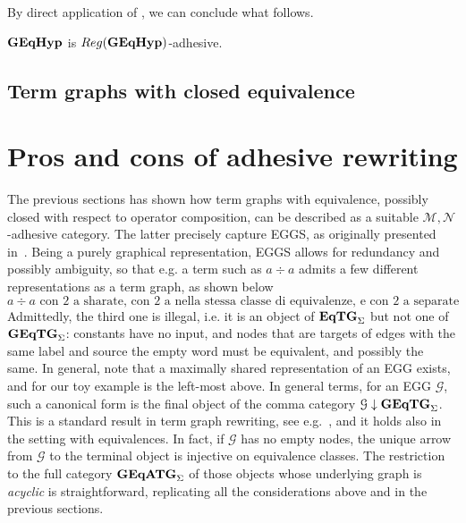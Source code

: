 \documentclass[a4paper,UKenglish,cleveref,pdftex,thm-restate,numberwithinsect]{lipics-v2021}
\newcommand{\catname}[1]{\textbf{\textup{#1}}}
\newcommand{\EqTGs}{\catname{EqTG}_{\Sigma}}
\newcommand{\GEqTGs}{\catname{GEqTG}_{\Sigma}}
\newcommand{\GEqATGs}{\catname{GEqATG}_{\Sigma}}
\newcommand{\egg}{\catname{GEqHyp}}
\newcommand{\reg}{\mathsf{Reg}}
\begin{document}
By direct application of , we can conclude what follows.

\begin{corollary}
	$\egg$ is $\reg(\egg)$-adhesive.
\end{corollary}

\subsection{Term graphs with closed equivalence}
\todo{Here we must introduce $\GEqTGs$}

\section{Pros and cons of adhesive rewriting}
\label{rewriting}
The previous sections has shown how term graphs with equivalence,
possibly closed with respect to operator composition,
can be described as a suitable $\mathcal{M},\mathcal{N}$-adhesive category. 
The latter precisely capture EGGS, as originally
presented in~\cite{WillseyNWFTP21}. 
%
Being a purely graphical representation, EGGS allows for redundancy and possibly ambiguity,
so that e.g. a term such as $a \div a$ admits a few different representations as a term graph, as shown below
%
\[a \div a \mbox{ con 2 a sharate, con 2 a nella stessa classe di equivalenze, e con 2 a separate}\]
%
Admittedly, the third one is illegal, i.e. it is an object of $\EqTGs$ but not one of $\GEqTGs$: constants have no input, 
and nodes that are targets of edges with the same label and source the empty word must be equivalent,
and possibly the same.
%
In general, note that a maximally shared representation of an EGG exists, and for our 
toy example is the left-most above. In general terms,
for an EGG $\mathcal{G}$, such a canonical form is the final object of the comma category 
$\mathcal{G}  \downarrow \GEqTGs$. 
This is a standard result in term graph rewriting, see e.g.~\cite{xxx}, and it holds also in the setting with equivalences.
In fact, if $\mathcal{G}$ has no empty nodes, the unique arrow from $\mathcal{G}$ to the terminal object
is injective on equivalence classes.
%
The restriction to the full category $\GEqATGs$ of those objects whose underlying graph is \emph{acyclic} is 
straightforward, replicating all the considerations 
above and in the previous sections.
\end{document}
